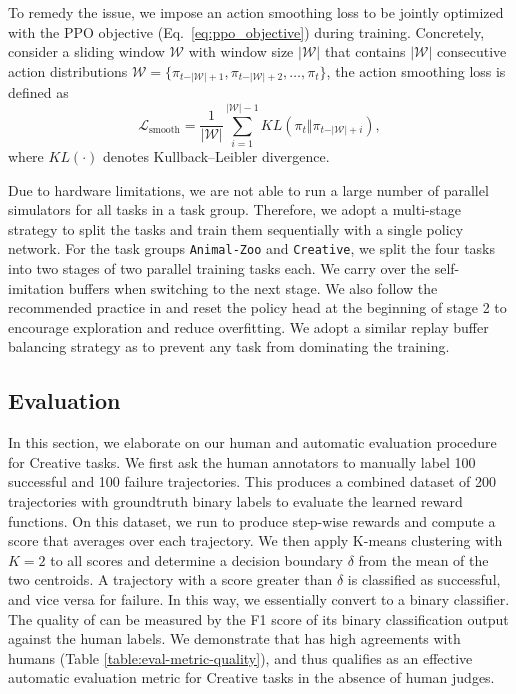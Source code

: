 To remedy the issue, we impose an action smoothing loss to be jointly optimized with the PPO objective (Eq.~\ref{eq:ppo_objective}) during training. Concretely, consider a sliding window $\mathcal{W}$ with window size $\vert \mathcal{W} \vert$ that contains $\vert \mathcal{W} \vert$ consecutive action distributions $\mathcal{W} = \{\pi_{t - \vert \mathcal{W} \vert + 1}, \pi_{t - \vert \mathcal{W} \vert + 2}, \ldots, \pi_{t} \}$, the action smoothing loss is defined as 
\begin{equation}
    \mathcal{L}_{\text{smooth}} = \frac{1}{\vert \mathcal{W} \vert} \sum_{i = 1}^{\vert \mathcal{W} \vert - 1} KL(\pi_t \Vert \pi_{t - \vert \mathcal{W} \vert + i}),
\end{equation}
where $KL(\cdot)$ denotes Kullback–Leibler divergence. 
 
Due to hardware limitations, we are not able to run a large number of parallel simulators for all tasks in a task group. Therefore, we adopt a multi-stage strategy to split the tasks and train them sequentially with a single policy network. For the task groups \texttt{Animal-Zoo} and \texttt{Creative}, we split the four tasks into two stages of two parallel training tasks each. We carry over the self-imitation buffers when switching to the next stage. We also follow the recommended practice in \cite{nikishin2022primacy} and reset the policy head at the beginning of stage 2 to encourage exploration and reduce overfitting. We adopt a similar replay buffer balancing strategy as \cite{gupta2022metamorph} to prevent any task from dominating the training. 

\subsection{Evaluation}
\label{supp:sec:mineclip_complex_creative}
In this section, we elaborate on our human and automatic evaluation procedure for Creative tasks.
We first ask the human annotators to manually label 100 successful and 100 failure trajectories. This produces a combined dataset of 200 trajectories with groundtruth binary labels to evaluate the learned reward functions.  
On this dataset, we run \mineclip to produce step-wise rewards and compute a score that averages over each trajectory. We then apply K-means clustering with $K = 2$ to all scores and determine a decision boundary $\delta$ from the mean of the two centroids. A trajectory with a score greater than $\delta$ is classified as successful, and vice versa for failure. In this way, we essentially convert \mineclip to a binary classifier. 
The quality of \mineclip can be measured by the F1 score of its binary classification output against the human labels. We demonstrate that \mineclip has high agreements with humans (Table \ref{table:eval-metric-quality}), and thus qualifies as an effective automatic evaluation metric for Creative tasks in the absence of human judges. 

